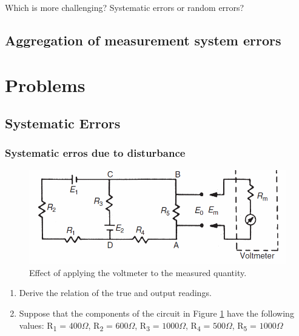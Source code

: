 \documentclass[a4paper,11pt]{book}
\begin{document}
\begin{question}
Which is more challenging? Systematic errors or random errors?
\end{question}
\begin{solution}


\end{solution}


\section*{Aggregation of measurement system errors}

\chapter*{Problems}

\section*{Systematic Errors}
\subsection*{Systematic erros due to disturbance}
\begin{question}[subtitle=System Disturbance]
\begin{figure}[h!]\label{fig:systematic_error_circuit}
\centering
  \includegraphics[width=0.8\linewidth]{systematic_error_circuit}
  \caption{Effect of applying the voltmeter to the measured quantity.} 
\end{figure}
\begin{enumerate}
\item Derive the relation of the true and output readings.
\item Suppose that the components of the circuit in Figure \ref{fig:systematic_error_circuit} have the following values:
 R\textsubscript{1} = $400\Omega$, R\textsubscript{2} = $600\Omega$, R\textsubscript{3} = $1000\Omega$, R\textsubscript{4} = $500\Omega$, R\textsubscript{5} = $1000\Omega$
\end{enumerate}
\examspace*{10em}

\end{question}
\begin{solution}


\end{solution}


\begin{question}


\examspace*{10em}

\end{question}
\begin{solution}


\end{solution}
\end{document}
